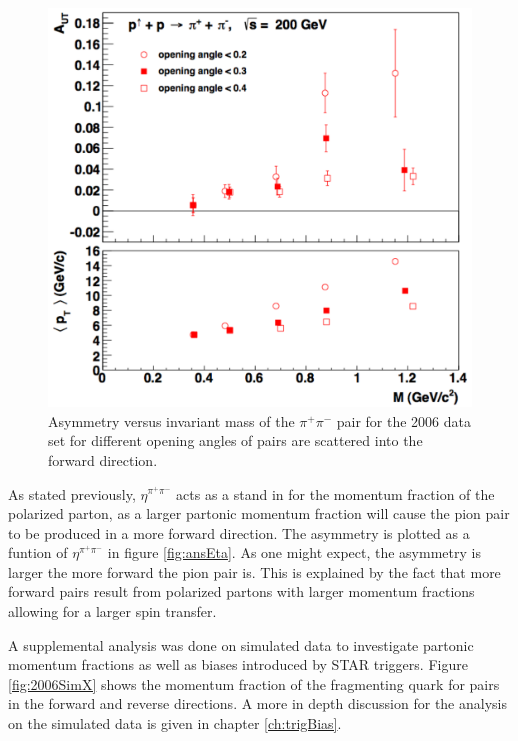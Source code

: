 \documentclass[abstract = on,listof=totoc, bibliography=totoc]{scrreprt}
\newcommand{\etapair}{\eta^{\pi^+\pi^-}}
\newcommand{\pip}{\pi^+}
\newcommand{\pim}{\pi^-}
\newcommand{\pair}{$\pip\pim$ }
\begin{document}
 \begin{figure}
\begin{center}
\includegraphics[width = 1\textwidth]{ansAngles_new}
\caption[$A_{UT}$ for different opening angles]{Asymmetry versus invariant mass of the \pair pair for the 2006 data set for different opening angles of pairs are scattered into the forward direction.}
\label{fig:ansAng}
\end{center}
\end{figure}

As stated previously, $\etapair$ acts as a stand in for the momentum fraction of the polarized parton, as a larger partonic momentum fraction will cause the pion pair to be produced in a more forward direction. The asymmetry is plotted as a funtion of $\etapair$ in figure \ref{fig:ansEta}. As one might expect, the asymmetry is larger the more forward the pion pair is. This is explained by the fact that more forward pairs result from polarized partons with larger momentum fractions allowing for a larger spin transfer. 

A supplemental analysis was done on simulated data to investigate partonic momentum fractions as well as biases introduced by STAR triggers. Figure \ref{fig:2006SimX} shows the momentum fraction of the fragmenting quark for pairs in the forward and reverse directions. A more in depth discussion for the analysis on the simulated data is given in chapter \ref{ch:trigBias}.
\end{document}
